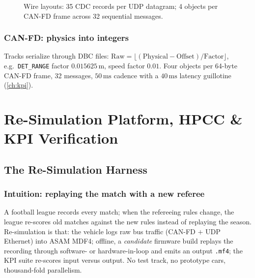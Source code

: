 \documentclass[11pt,oneside]{book}
\begin{document}
\begin{figure}[htbp]
\centering
{}
\caption{Wire layouts: 35 CDC records per UDP datagram; 4 objects per
CAN-FD frame across 32 sequential messages.}
\label{fig:wire}
\end{figure}

\section{CAN-FD: physics into integers}
\label{sec:canfd}

Tracks serialize through DBC files: $\mathrm{Raw}=\lfloor(\mathrm{Physical}
-\mathrm{Offset})/\mathrm{Factor}\rfloor$, e.g.\ \texttt{DET\_RANGE} factor
$0.015625\,\mathrm{m}$, speed factor $0.01$. Four objects per 64-byte CAN-FD
frame, 32 messages, $50\,\mathrm{ms}$ cadence with a $40\,\mathrm{ms}$
latency guillotine (\cref{ch:kpi}).

\part{Re-Simulation Platform, HPCC \& KPI Verification}

\chapter{The Re-Simulation Harness}
\label{ch:resim}

\section{Intuition: replaying the match with a new referee}
\label{sec:replay}

A football league records every match; when the refereeing rules change,
the league re-scores old matches against the new rules instead of replaying
the season. Re-simulation is that: the vehicle logs raw bus traffic
(CAN-FD $+$ UDP Ethernet) into ASAM MDF4; offline, a \emph{candidate}
firmware build replays the recording through software- or hardware-in-loop
and emits an output \texttt{.mf4}; the KPI suite re-scores input versus
output. No test track, no prototype cars, thousand-fold parallelism.
\end{document}
